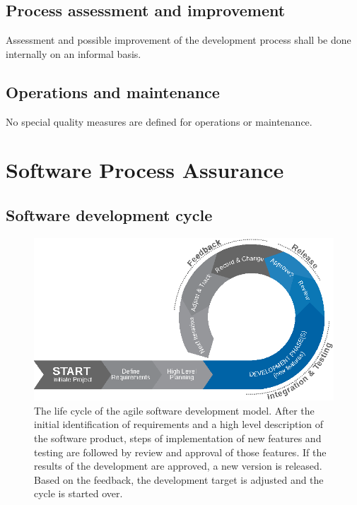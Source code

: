 \section{Process assessment and improvement}

Assessment and possible improvement of the development process shall be done 
internally on an informal basis.


\section{Operations and maintenance}

No special quality measures are defined for operations or maintenance.



\chapter{Software Process Assurance}


\section{Software development cycle}


\begin{figure}[htb]
\begin{center}
	\includegraphics[width=\columnwidth]{images/agile_sw_dev}
	\caption{The life cycle of the agile software development model.
		 After the initial identification of requirements and a high
		 level description of the software product, steps of
		 implementation of new features and testing are followed
		 by review and approval of those features. If the results
		 of the development are approved, a new version is released.
		 Based on the feedback, the development target is adjusted and
		 the cycle is started over.}
	\label{fig:agile_sw}
\end{center}
\end{figure}

